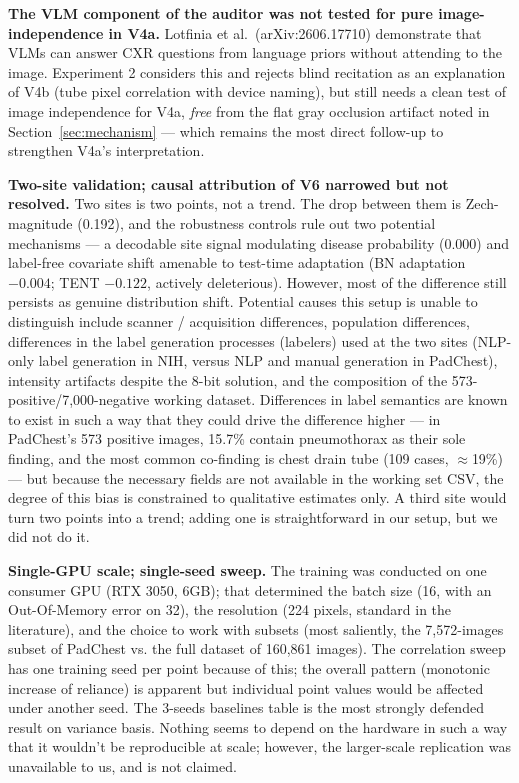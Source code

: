 \documentclass{ieeeaccess}
\begin{document}
\textbf{The VLM component of the auditor was not tested for pure image-independence in V4a.} Lotfinia et al.\ (arXiv:2606.17710) \cite{lotfinia2026} demonstrate that VLMs can answer CXR questions from language priors without attending to the image. Experiment 2 considers this and rejects blind recitation as an explanation of V4b (tube pixel correlation with device naming), but still needs a clean test of image independence for V4a, \emph{free} from the flat gray occlusion artifact noted in Section~\ref{sec:mechanism} --- which remains the most direct follow-up to strengthen V4a's interpretation.

\textbf{Two-site validation; causal attribution of V6 narrowed but not resolved.} Two sites is two points, not a trend. The drop between them is Zech-magnitude (0.192), and the robustness controls rule out two potential mechanisms --- a decodable site signal modulating disease probability (0.000) and label-free covariate shift amenable to test-time adaptation (BN adaptation $-0.004$; TENT $-0.122$, actively deleterious). However, most of the difference still persists as genuine distribution shift. Potential causes this setup is unable to distinguish include scanner / acquisition differences, population differences, differences in the label generation processes (labelers) used at the two sites (NLP-only label generation in NIH, versus NLP and manual generation in PadChest), intensity artifacts despite the 8-bit solution, and the composition of the 573-positive/7,000-negative working dataset. Differences in label semantics are known to exist in such a way that they could drive the difference higher --- in PadChest's 573 positive images, 15.7\% contain pneumothorax as their sole finding, and the most common co-finding is chest drain tube (109 cases, $\approx$19\%) --- but because the necessary fields are not available in the working set CSV, the degree of this bias is constrained to qualitative estimates only. A third site would turn two points into a trend; adding one is straightforward in our setup, but we did not do it.

\textbf{Single-GPU scale; single-seed sweep.} The training was conducted on one consumer GPU (RTX 3050, 6GB); that determined the batch size (16, with an Out-Of-Memory error on 32), the resolution (224 pixels, standard in the literature), and the choice to work with subsets (most saliently, the 7,572-images subset of PadChest vs. the full dataset of 160,861 images). The correlation sweep has one training seed per point because of this; the overall pattern (monotonic increase of reliance) is apparent but individual point values would be affected under another seed. The 3-seeds baselines table is the most strongly defended result on variance basis. Nothing seems to depend on the hardware in such a way that it wouldn't be reproducible at scale; however, the larger-scale replication was unavailable to us, and is not claimed.
\end{document}
